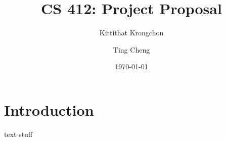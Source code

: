 \documentclass[onecolumn,aps,pra,floatfix,nolongbibliography,11pt]{revtex4-2}
\begin{document}
\title{CS 412: Project Proposal}
\author{Kittithat Krongchon}
\author{Ting Cheng}
\date{\today}

\maketitle


\section{Introduction}

text stuff
\end{document}
